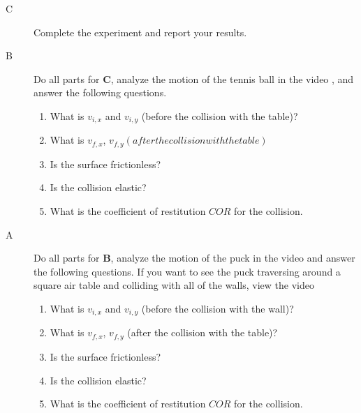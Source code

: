 \report

\begin{description}

\item[C]  Complete the experiment and report your results.

\item[B] Do all parts for {\bf C}, analyze the motion of the tennis ball in the video , and answer the following questions.

\begin{enumerate}
 \item What is $v_{i,x}$ and $v_{i,y}$ (before the collision with the table)?
 \item What is $v_{f,x}$, $v_{f,y} (after the collision with the table)$
 \item Is the surface frictionless?
 \item Is the collision elastic?
 \item What is the coefficient of restitution $COR$ for the collision.
\end{enumerate}

\item[A] Do all parts for {\bf B}, analyze the motion of the puck in the video  and answer the following questions. If you want to see the puck traversing around a square air table and colliding with all of the walls, view the video 
\begin{enumerate}
 \item What is $v_{i,x}$ and $v_{i,y}$ (before the collision with the wall)?
 \item What is $v_{f,x}$, $v_{f,y}$ (after the collision with the table)?
 \item Is the surface frictionless?
 \item Is the collision elastic?
 \item What is the coefficient of restitution $COR$ for the collision.
\end{enumerate}
\end{description}


